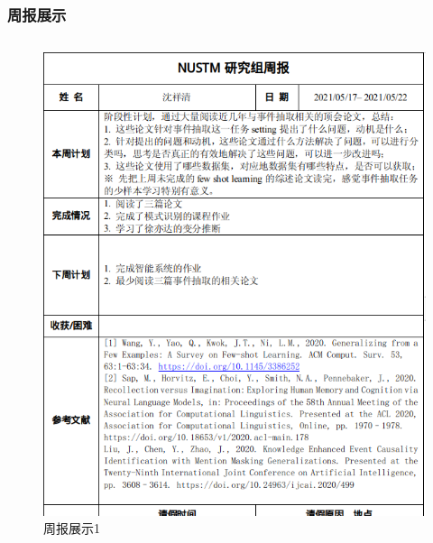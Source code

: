 \documentclass[10pt,aspectratio=43,mathserif]{beamer}
\begin{document}
		\begin{frame}
		  \frametitle{\textbf{周报展示}}
            \begin{columns}[b]

                \begin{figure}
                    \centering
                    \includegraphics[width=1.1\textwidth]{figures/report1.png}
                    \caption{周报展示1}
                    \label{fig:report1}
                \end{figure}


\end{columns}
\end{frame}
\end{document}
